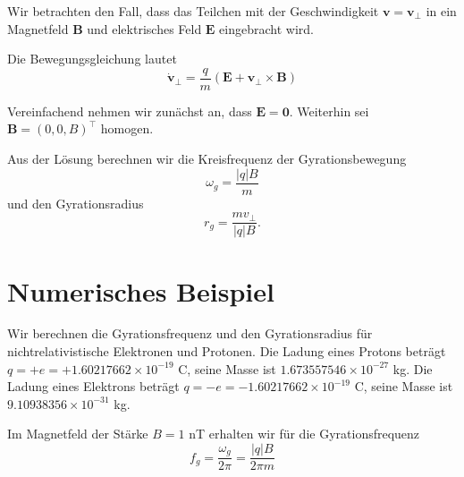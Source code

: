 \documentclass[
  a4paper,
  DIV=11]{scrreprt}
\begin{document}
Wir betrachten den Fall, dass das Teilchen mit der Geschwindigkeit
\(\mathbf v = \mathbf v_\perp\) in ein Magnetfeld \(\mathbf B\) und
elektrisches Feld \(\mathbf E\) eingebracht wird.

Die Bewegungsgleichung lautet \[
\dot{\mathbf v}_\perp = \frac{q}{m} \left( \mathbf E +  \mathbf v_\perp \times \mathbf B \right)
\]

Vereinfachend nehmen wir zunächst an, dass \(\mathbf E = \mathbf 0\).
Weiterhin sei \(\mathbf B = (0, 0, B)^\top\) homogen.

Aus der Lösung berechnen wir die Kreisfrequenz der Gyrationsbewegung \[
\omega_g = \frac{|q| B}{m}
\] und den Gyrationsradius \[
r_g = \frac{m v_\perp}{|q| B}.
\]

\hypertarget{numerisches-beispiel}{%
\section{Numerisches Beispiel}\label{numerisches-beispiel}}

Wir berechnen die Gyrationsfrequenz und den Gyrationsradius für
nichtrelativistische Elektronen und Protonen. Die Ladung eines Protons
beträgt \(q = +e = +1.60217662 \times 10^{-19}\) C, seine Masse ist
\(1.673557546 \times 10^{-27}\) kg. Die Ladung eines Elektrons beträgt
\(q = -e = -1.60217662 \times 10^{-19}\) C, seine Masse ist
\(9.10938356 \times 10^{-31}\) kg.

Im Magnetfeld der Stärke \(B = 1\) nT erhalten wir für die
Gyrationsfrequenz \[
f_g = \frac{\omega_g}{2 \pi} = \frac{|q| B}{2 \pi m}
\]
\end{document}
